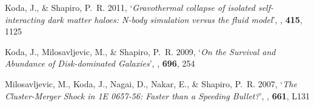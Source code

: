 \begin{thebibliography}{8}




{Koda}, J., \& {Shapiro}, P.~R. 2011, `{\it Gravothermal collapse of isolated
  self-interacting dark matter haloes: N-body simulation versus the fluid
  model}', {\em \mnras\/}, {\bf 415}, 1125

{Koda}, J., {Milosavljevic}, M., \& {Shapiro}, P.~R. 2009{},
  `{\it On the Survival and Abundance of Disk-dominated Galaxies}', {\em \apj\/},
  {\bf 696}, 254 %

{Milosavljevic}, M., {Koda}, J., {Nagai}, D., {Nakar}, E., \& {Shapiro},
  P.~R. 2007, `{\it The Cluster-Merger Shock in 1E 0657-56: Faster than a Speeding
  Bullet?}', {\em \apjl\/}, {\bf 661}, L131 %

\end{thebibliography}


